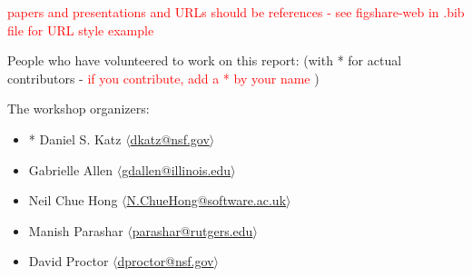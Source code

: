 \documentclass[11pt, oneside]{amsart}
\newcommand{\note}[1]{ {\textcolor{red}    { #1 }}}
\begin{document}
\note{papers and presentations and URLs should be references - see
  figshare-web in .bib file for URL style example}

People who have volunteered to work on this report: (with * for actual
contributors - \note{if you contribute, add a * by your name})

The workshop organizers:
\begin{itemize}
\item * Daniel S. Katz $\langle$\url{dkatz@nsf.gov}$\rangle$
\item Gabrielle Allen $\langle$\url{gdallen@illinois.edu}$\rangle$
\item Neil Chue Hong $\langle$\url{N.ChueHong@software.ac.uk}$\rangle$
\item Manish Parashar $\langle$\url{parashar@rutgers.edu}$\rangle$
\item David Proctor $\langle$\url{dproctor@nsf.gov}$\rangle$
\end{itemize}
\end{document}
